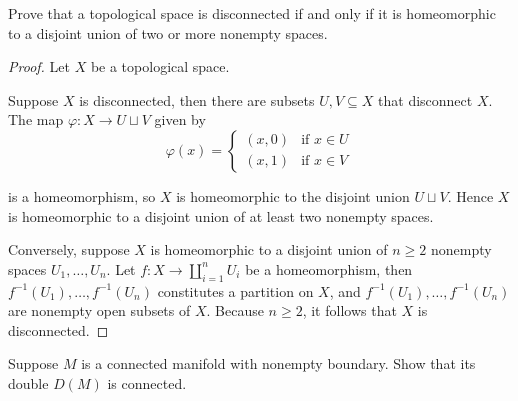 \begin{exercise}{4.5}
	Prove that a topological space is disconnected if and only if it is homeomorphic to a disjoint union of two or more nonempty spaces.
\end{exercise}

\begin{proof}
	Let $X$ be a topological space.

	Suppose $X$ is disconnected, then there are subsets $U, V\subseteq X$ that disconnect $X$. The map $\varphi: X \to U\sqcup V$ given by
	\begin{equation*}
		\varphi(x) = \begin{cases}
			(x, 0) & \text{if $x \in U$} \\
			(x, 1) & \text{if $x \in V$}
		\end{cases}
	\end{equation*}

	is a homeomorphism, so $X$ is homeomorphic to the disjoint union $U\sqcup V$. Hence $X$ is homeomorphic to a disjoint union of at least two nonempty spaces.

	Conversely, suppose $X$ is homeomorphic to a disjoint union of $n\geq 2$ nonempty spaces $U_{1}, \ldots, U_{n}$. Let $f: X\to \coprod^{n}_{i=1}U_{i}$ be a homeomorphism, then $f^{-1}(U_{1}), \ldots, f^{-1}(U_{n})$ constitutes a partition on $X$, and $f^{-1}(U_{1}), \ldots, f^{-1}(U_{n})$ are nonempty open subsets of $X$. Because $n\geq 2$, it follows that $X$ is disconnected.
\end{proof}

\begin{exercise}{4.10}
	Suppose $M$ is a connected manifold with nonempty boundary. Show that its double $D(M)$ is connected.
\end{exercise}

